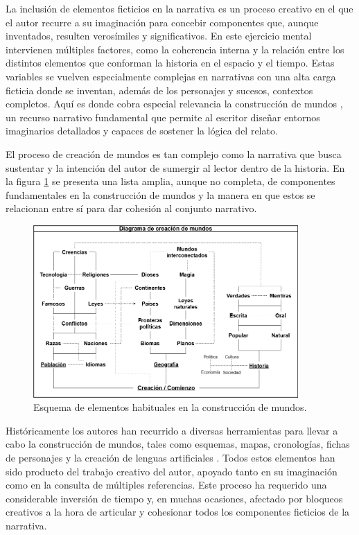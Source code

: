 La inclusión de elementos ficticios en la narrativa es un proceso creativo
en el que el autor recurre a su imaginación para concebir componentes que, aunque inventados,
resulten verosímiles y significativos.
En este ejercicio mental intervienen múltiples factores, como la coherencia interna y la relación 
entre los distintos elementos que conforman la historia en el espacio y el tiempo.
Estas variables se vuelven especialmente complejas en narrativas con una alta carga ficticia
donde se inventan, además de los personajes y sucesos, contextos completos.
Aquí es donde cobra especial relevancia la construcción de mundos \cite{world_building}, un recurso narrativo fundamental que permite
al escritor diseñar entornos imaginarios detallados y capaces de sostener la lógica del relato.

El proceso de creación de mundos es tan complejo como la narrativa que busca sustentar y
la intención del autor de sumergir al lector dentro de la historia.
En la figura \ref{fig:worldBuildingElements} se presenta una lista amplia, aunque no completa,
de componentes fundamentales en la construcción de mundos 
y la manera en que estos se relacionan entre sí para dar cohesión al conjunto narrativo.

\begin{figure}[htbp]
	\centering
	\includegraphics[width=0.9\textwidth]{./Figures/world-building-elements.png}
	\caption{Esquema de elementos habituales en la construcción de mundos.}
	\label{fig:worldBuildingElements}
\end{figure}

\pagebreak

Históricamente los autores han recurrido a diversas herramientas para llevar a cabo la construcción de mundos,
tales como esquemas, mapas, cronologías, fichas de personajes y la creación de lenguas artificiales \cite{tolkien_letters}.
Todos estos elementos han sido producto del trabajo creativo del autor, apoyado tanto en su imaginación como en la
consulta de múltiples referencias.
Este proceso ha requerido una considerable inversión de tiempo y, en muchas ocasiones,
afectado por bloqueos creativos a la hora de articular y cohesionar todos los componentes ficticios de la narrativa.

